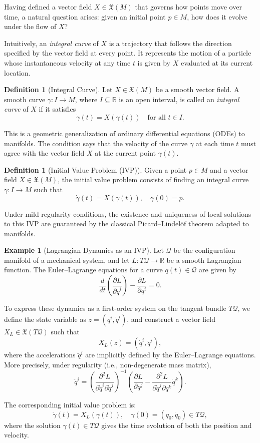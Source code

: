 \documentclass{article}
\theoremstyle{plain}
\theoremstyle{definition}
\newtheorem{definition}[theorem]{Definition}
\newtheorem{example}[theorem]{Example}
\theoremstyle{remark}
\begin{document}
Having defined a vector field $X \in \mathfrak{X}(M)$ that governs how points move over time, a natural question arises: given an initial point $p \in M$, how does it evolve under the flow of $X$?

Intuitively, an \textit{integral curve} of $X$ is a trajectory that follows the direction specified by the vector field at every point. It represents the motion of a particle whose instantaneous velocity at any time $t$ is given by $X$ evaluated at its current location.

\begin{definition}[Integral Curve]
Let $X \in \mathfrak{X}(M)$ be a smooth vector field. A smooth curve $\gamma: I \to M$, where $I \subseteq \mathbb{R}$ is an open interval, is called an \emph{integral curve} of $X$ if it satisfies
\[
\dot{\gamma}(t) = X(\gamma(t)) \quad \text{for all } t \in I.
\]
\end{definition}

This is a geometric generalization of ordinary differential equations (ODEs) to manifolds. The condition says that the velocity of the curve $\gamma$ at each time $t$ must agree with the vector field $X$ at the current point $\gamma(t)$.

\begin{definition}[Initial Value Problem (IVP)]
Given a point $p \in M$ and a vector field $X \in \mathfrak{X}(M)$, the initial value problem consists of finding an integral curve $\gamma: I \to M$ such that
\[
\dot{\gamma}(t) = X(\gamma(t)), \quad \gamma(0) = p.
\]
\end{definition}

Under mild regularity conditions, the existence and uniqueness of local solutions to this IVP are guaranteed by the classical Picard–Lindelöf theorem adapted to manifolds.

\begin{example}[Lagrangian Dynamics as an IVP]
Let $\mathcal{Q}$ be the configuration manifold of a mechanical system, and let $L: T\mathcal{Q} \to \mathbb{R}$ be a smooth Lagrangian function. The Euler–Lagrange equations for a curve $q(t) \in \mathcal{Q}$ are given by
\[
\frac{d}{dt} \left( \frac{\partial L}{\partial \dot{q}^i} \right) - \frac{\partial L}{\partial q^i} = 0.
\]

To express these dynamics as a first-order system on the tangent bundle $T\mathcal{Q}$, we define the state variable as $z = (q^i, \dot{q}^i)$, and construct a vector field $X_L \in \mathfrak{X}(T\mathcal{Q})$ such that
\[
X_L(z) = \left( \dot{q}^i, \ddot{q}^i \right),
\]
where the accelerations $\ddot{q}^i$ are implicitly defined by the Euler–Lagrange equations. More precisely, under regularity (i.e., non-degenerate mass matrix),
\[
\ddot{q}^i = \left( \frac{\partial^2 L}{\partial \dot{q}^i \partial \dot{q}^j} \right)^{-1} \left( \frac{\partial L}{\partial q^j} - \frac{\partial^2 L}{\partial \dot{q}^j \partial q^k} \dot{q}^k \right).
\]

The corresponding initial value problem is:
\[
\dot{\gamma}(t) = X_L(\gamma(t)), \quad \gamma(0) = (q_0, \dot{q}_0) \in T\mathcal{Q},
\]
where the solution $\gamma(t) \in T\mathcal{Q}$ gives the time evolution of both the position and velocity.
\end{example}
\end{document}
